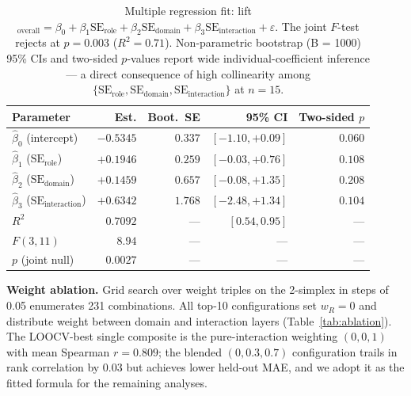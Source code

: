 \documentclass[11pt,a4paper]{article}
\newcommand{\se}{\mathrm{SE}}
\newcommand{\serole}{\se_{\text{role}}}
\newcommand{\sedom}{\se_{\text{domain}}}
\newcommand{\seint}{\se_{\text{interaction}}}
\begin{document}
\begin{table}[t]
\centering
\caption{Multiple regression fit: lift$_{\text{overall}} = \beta_0 +
\beta_1 \serole + \beta_2 \sedom + \beta_3 \seint + \varepsilon$. The
joint $F$-test rejects at $p = 0.003$ ($R^2 = 0.71$). Non-parametric
bootstrap (B = 1000) 95\% CIs and two-sided $p$-values report wide
individual-coefficient inference --- a direct consequence of high
collinearity among $\{\serole, \sedom, \seint\}$ at $n=15$.}
\label{tab:regression}
\small
\begin{tabular}{@{}lrrrr@{}}
\toprule
\textbf{Parameter} & \textbf{Est.} & \textbf{Boot.\ SE} &
\textbf{95\% CI} & \textbf{Two-sided $p$} \\
\midrule
$\hat{\beta}_0$ (intercept) & $-0.5345$ & $0.337$ & $[-1.10, +0.09]$ & $0.060$ \\
$\hat{\beta}_1$ ($\serole$) & $+0.1946$ & $0.259$ & $[-0.03, +0.76]$ & $0.108$ \\
$\hat{\beta}_2$ ($\sedom$)  & $+0.1459$ & $0.657$ & $[-0.08, +1.35]$ & $0.208$ \\
$\hat{\beta}_3$ ($\seint$)  & $+0.6342$ & $1.768$ & $[-2.48, +1.34]$ & $0.104$ \\
\midrule
$R^2$                       & $0.7092$ & --- & $[0.54, 0.95]$ & --- \\
$F(3, 11)$                  & $8.94$ & --- & --- & --- \\
$p$ (joint null)            & $0.0027$ & --- & --- & --- \\
\bottomrule
\end{tabular}
\end{table}

\textbf{Weight ablation.} Grid search over weight triples on the
2-simplex in steps of 0.05 enumerates 231 combinations. All top-10
configurations set $w_R = 0$ and distribute weight between domain and
interaction layers (Table~\ref{tab:ablation}). The LOOCV-best single
composite is the pure-interaction weighting $(0, 0, 1)$ with mean
Spearman $r = 0.809$; the blended $(0, 0.3, 0.7)$ configuration trails
in rank correlation by 0.03 but achieves lower held-out MAE, and we
adopt it as the fitted formula for the remaining analyses.
\end{document}
